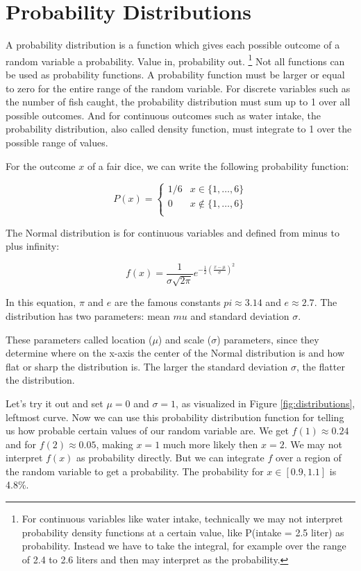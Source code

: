 \documentclass[
  10pt,
]{scrbook}
\begin{document}
\hypertarget{probability-distributions}{%
\section{Probability Distributions}\label{probability-distributions}}

A probability distribution is a function which gives each possible outcome of a random variable a probability.
Value in, probability out. \footnote{For continuous variables like water intake, technically we may not interpret probability density functions at a certain value, like P(intake = 2.5 liter) as probability. Instead we have to take the integral, for example over the range of 2.4 to 2.6 liters and then may interpret as the probability.}
Not all functions can be used as probability functions.
A probability function must be larger or equal to zero for the entire range of the random variable.
For discrete variables such as the number of fish caught, the probability distribution must sum up to 1 over all possible outcomes.
And for continuous outcomes such as water intake, the probability distribution, also called density function, must integrate to 1 over the possible range of values.

For the outcome \(x\) of a fair dice, we can write the following probability function:

\[
P(x) = 
\begin{cases}
 1/6 & x \in \{1, \ldots, 6\} \\
 0 & x \notin \{1, \ldots, 6\} \\
\end{cases}
\]

The Normal distribution is for continuous variables and defined from minus to plus infinity:

\[f(x) = \frac{1}{\sigma \sqrt{2\pi}} e^{-\frac{1}{2}\left(\frac{x-\mu}{\sigma}\right)^2}\]

In this equation, \(\pi\) and \(e\) are the famous constants \(pi \approx 3.14\) and \(e \approx 2.7\).
The distribution has two parameters: mean \(mu\) and standard deviation \(\sigma\).

These parameters called location (\(\mu\)) and scale (\(\sigma\)) parameters, since they determine where on the x-axis the center of the Normal distribution is and how flat or sharp the distribution is.
The larger the standard deviation \(\sigma\), the flatter the distribution.

Let's try it out and set \(\mu = 0\) and \(\sigma = 1\), as visualized in Figure \ref{fig:distributions}, leftmost curve.
Now we can use this probability distribution function for telling us how probable certain values of our random variable are.
We get \(f(1) \approx 0.24\) and for \(f(2) \approx 0.05\), making \(x=1\) much more likely then \(x=2\).
We may not interpret \(f(x)\) as probability directly.
But we can integrate \(f\) over a region of the random variable to get a probability.
The probability for \(x \in [0.9, 1.1]\) is 4.8\%.
\end{document}
